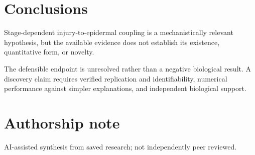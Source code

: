 \documentclass[11pt]{article}
\begin{document}
\section{Conclusions}
Stage-dependent injury-to-epidermal coupling is a mechanistically relevant hypothesis, but the available evidence does not establish its existence, quantitative form, or novelty.

The defensible endpoint is unresolved rather than a negative biological result. A discovery claim requires verified replication and identifiability, numerical performance against simpler explanations, and independent biological support.

\section*{Authorship note}
AI-assisted synthesis from saved research; not independently peer reviewed.
\end{document}

